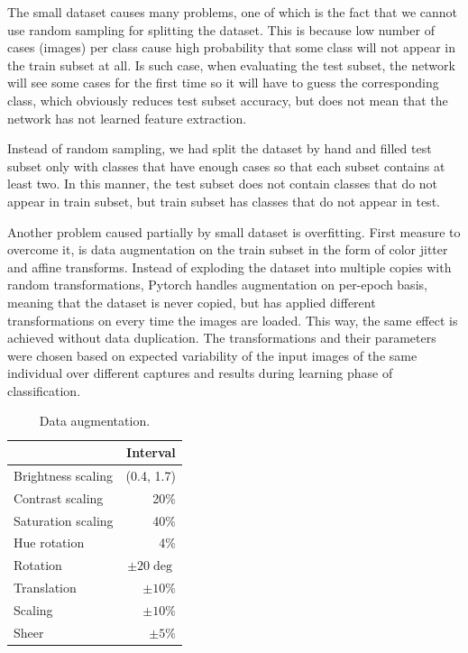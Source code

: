 \documentclass[fleqn,moreauthors,10pt]{ds_report}
\begin{document}
The small dataset causes many problems, one of which is the fact that we cannot use random sampling for splitting the dataset. This is because low number of cases (images) per class cause high probability that some class will not appear in the train subset at all. Is such case, when evaluating the test subset, the network will see some cases for the first time so it will have to guess the corresponding class, which obviously reduces test subset accuracy, but does not mean that the network has not learned feature extraction.

Instead of random sampling, we had split the dataset by hand and filled test subset only with classes that have enough cases so that each subset contains at least two. In this manner, the test subset does not contain classes that do not appear in train subset, but train subset has classes that do not appear in test.

Another problem caused partially by small dataset is overfitting. First measure to overcome it, is data augmentation on the train subset in the form of color jitter and affine transforms. Instead of exploding the dataset into multiple copies with random transformations, Pytorch handles augmentation on per-epoch basis, meaning that the dataset is never copied, but has applied different transformations on every time the images are loaded. This way, the same effect is achieved without data duplication. The transformations and their parameters were chosen based on expected variability of the input images of the same individual over different captures and results during learning phase of classification.

\begin{table}[h]
	\caption{Data augmentation.}
	\centering
	\begin{tabular}{l | r }
		\toprule
		                   & Interval     \\
		\midrule
		Brightness scaling & (0.4, 1.7)   \\
		Contrast scaling   & 20\%         \\
		Saturation scaling & 40\%         \\
		Hue rotation       & 4\%          \\
		Rotation           & $\pm20\deg$  \\
		Translation        & $\pm10\%$    \\
		Scaling            & $\pm10\%$    \\
		Sheer              & $\pm5\%$     \\
		\bottomrule
	\end{tabular}
	\label{tab:augmentation}
\end{table}
\end{document}
